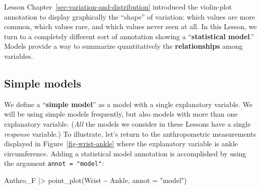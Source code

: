 \documentclass[
  letterpaper,
  DIV=11,
  numbers=noendperiod,
  oneside]{scrartcl}
\newenvironment{Shaded}{\begin{snugshade}}{\end{snugshade}}
\newcommand{\AttributeTok}[1]{\textcolor[rgb]{0.40,0.45,0.13}{#1}}
\newcommand{\FunctionTok}[1]{\textcolor[rgb]{0.28,0.35,0.67}{#1}}
\newcommand{\NormalTok}[1]{\textcolor[rgb]{0.00,0.23,0.31}{#1}}
\newcommand{\SpecialCharTok}[1]{\textcolor[rgb]{0.37,0.37,0.37}{#1}}
\newcommand{\StringTok}[1]{\textcolor[rgb]{0.13,0.47,0.30}{#1}}
\begin{document}
Lesson Chapter~\ref{sec-variation-and-distribution} introduced the
violin-plot annotation to display graphically the ``shape'' of
variation: which values are more common, which values rare, and which
values never seen at all. In this Lesson, we turn to a completely
different sort of annotation showing a ``\textbf{statistical model}.''
Models provide a way to summarize quantitatively the
\textbf{relationships} among variables.

\subsection{Simple models}\label{simple-models}

We define a ``\textbf{simple model}'' as a model with a single
explanatory variable. We will be using simple models frequently, but
also models with more than one explanatory variable. (\emph{All} the
models we consider in these Lessons have a single \emph{response}
variable.) To illustrate, let's return to the anthropometric
measurements displayed in Figure~\ref{fig-wrist-ankle} where the
explanatory variable is ankle circumference. Adding a statistical model
annotation is accomplished by using the argument
\texttt{annot\ =\ "model"}:

\begin{Shaded}
\begin{Highlighting}[]
\NormalTok{Anthro\_F }\SpecialCharTok{|\textgreater{}} \FunctionTok{point\_plot}\NormalTok{(Wrist }\SpecialCharTok{\textasciitilde{}}\NormalTok{ Ankle, }\AttributeTok{annot =} \StringTok{"model"}\NormalTok{)}
\end{Highlighting}
\end{Shaded}

\begin{figure}[H]



\end{figure}%
\end{document}
